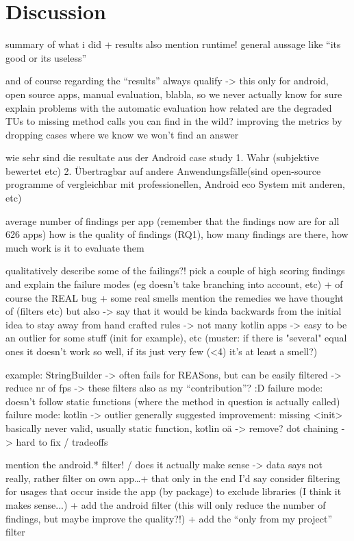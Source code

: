 \section{Discussion}

summary of what i did + results
also mention runtime!
general aussage like ``its good or its useless''

and of course regarding the ``results'' always qualify -> this only for android, open source apps, manual evaluation, blabla, so we never actually know for sure
explain problems with the automatic evaluation
how related are the degraded TUs to missing method calls you can find in the wild?
improving the metrics by dropping cases where we know we won't find an answer

wie sehr sind die resultate aus der Android case study 1. Wahr (subjektive bewertet etc) 2. Übertragbar auf andere Anwendungsfälle(sind open-source programme of vergleichbar mit professionellen, Android eco System mit anderen, etc)

average number of findings per app (remember that the findings now are for all 626 apps)
how is the quality of findings (RQ1), how many findings are there, how much work is it to evaluate them

qualitatively describe some of the failings?! 
pick a couple of high scoring findings and explain the failure modes (eg doesn't take branching into account, etc)
+ of course the REAL bug + some real smells
mention the remedies we have thought of (filters etc) but also -> say that it would be kinda backwards from the initial idea to stay away from hand crafted rules
-> not many kotlin apps -> easy to be an outlier for some stuff (init for example), etc
(muster: if there is "several" equal ones it doesn't work so well, if its just very few (<4) it's at least a smell?)

example: StringBuilder -> often fails for REASons, but can be easily filtered -> reduce nr of fps
-> these filters also as my ``contribution''? :D 
failure mode: doesn't follow static functions (where the method in question is actually called)
failure mode: kotlin -> outlier generally
suggested improvement: missing <init> basically never valid, usually static function, kotlin oä -> remove?
dot chaining -> hard to fix / tradeoffs

mention the android.* filter! / does it actually make sense -> data says not really, rather filter on own app\ldots + that only in the end I'd say
consider filtering for usages that occur inside the app (by package) to exclude libraries (I think it makes sense...)
+ add the android filter (this will only reduce the number of findings, but maybe improve the quality?!)
+ add the ``only from my project'' filter

